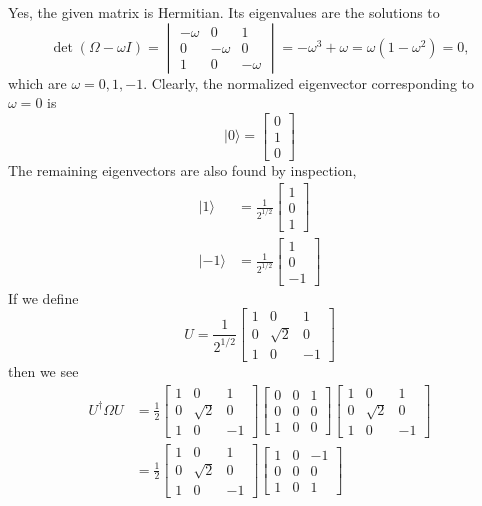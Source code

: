 \documentclass[../principles-of-quantum-mechanics.tex]{subfiles}
\begin{document}
\begin{questions}
\begin{solution}
	Yes, the given matrix is Hermitian. Its eigenvalues are the solutions to
	\[
		\det(\Omega - \omega{I}) = \begin{vmatrix}
			-\omega & 0 & 1 \\ 0 & -\omega & 0 \\ 1 & 0 & -\omega
		\end{vmatrix} = -\omega^3+\omega = \omega(1 - \omega^2) = 0,
	\]
	which are $\omega=0,1,{-1}$. Clearly, the normalized eigenvector corresponding to $\omega=0$ is
	\[
		|0\rangle = \begin{bmatrix}0 \\ 1 \\ 0\end{bmatrix}
	\]
	The remaining eigenvectors are also found by inspection,
	\begin{align*}
		|1\rangle &= \frac{1}{2^{1/2}}\begin{bmatrix}1 \\ 0 \\ 1\end{bmatrix} \\
		|{-1}\rangle &= \frac{1}{2^{1/2}}\begin{bmatrix}1 \\ 0 \\ -1\end{bmatrix}
	\end{align*}
	If we define
	\[
		U = \frac{1}{2^{1/2}}\begin{bmatrix}1 & 0 & 1 \\ 0 & \sqrt{2} & 0 \\ 1 & 0 & {-1}\end{bmatrix}
	\]
	then we see
	\begin{align*}
		U^\dagger\Omega{U} &= \frac{1}{2}\begin{bmatrix}1 & 0 & 1 \\ 0 & \sqrt{2} & 0 \\ 1 & 0 & {-1}\end{bmatrix}\begin{bmatrix}0 & 0 & 1 \\ 0 & 0 & 0 \\ 1 & 0 & 0 \end{bmatrix}\begin{bmatrix}1 & 0 & 1 \\ 0 & \sqrt{2} & 0 \\ 1 & 0 & {-1}\end{bmatrix} \\
		&= \frac{1}{2}\begin{bmatrix}1 & 0 & 1 \\ 0 & \sqrt{2} & 0 \\ 1 & 0 & {-1}\end{bmatrix}\begin{bmatrix}1 & 0 & -1\\ 0 & 0 & 0 \\ 1 & 0 & 1\end{bmatrix} \\

\end{align*}
\end{solution}
\end{questions}
\end{document}
